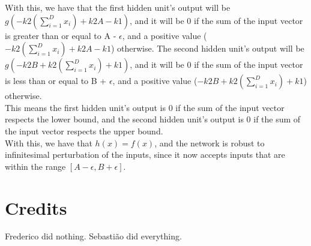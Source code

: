 \documentclass{article}
\begin{document}
With this, we have that the first hidden unit's output will be $g(-k2(\sum_{i=1}^{D} x_i) + k2A - k1)$, and it will be 0 if the sum of the 
input vector is greater than or equal to A - $\epsilon$, and a positive value ($-k2(\sum_{i=1}^{D} x_i) + k2A - k1$) otherwise. 
The second hidden unit's output will be $g(-k2B + k2(\sum_{i=1}^{D} x_i) + k1)$, and it will be 0 if the sum of the input vector is less than or equal 
to B + $\epsilon$, and a positive value ($-k2B + k2(\sum_{i=1}^{D} x_i) + k1$) otherwise. \\
This means the first hidden unit's output is 0 if the sum of the input vector respects the lower bound,
and the second hidden unit's output is 0 if the sum of the input vector respects the upper bound. \\
With this, we have that \(h(x) = f(x)\), and the network is robust to infinitesimal perturbation of the inputs, since it now accepts inputs
that are within the range \([A - \epsilon, B + \epsilon]\).

\section{Credits}

Frederico did nothing.
Sebastião did everything.
\end{document}
